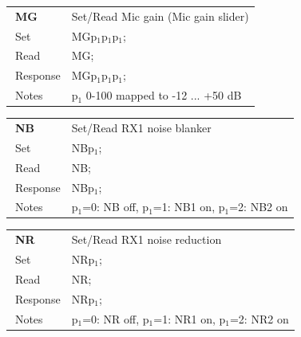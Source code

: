 \documentclass[12pt]{book}
\begin{document}
\begin{center}
\begin{tabular}{|p{2cm}|p{11cm}|}
\toprule
$\phantom{\Big|}$\textbf{\large MG} & Set/Read Mic gain (Mic gain slider) \\\cline{1-2}
$\phantom{\Big|}${\large Set} & {MGp$_1$p$_1$p$_1$;} \\\hline
$\phantom{\Big|}${\large Read} & {MG;} \\\hline
$\phantom{\Big|}${\large Response} & {MGp$_1$p$_1$p$_1$;} \\\hline
$\phantom{\Big|}${\large Notes} & \multicolumn{1}{|p{11cm}|}{p$_1$ 0-100 mapped to -12 ... +50 dB} \\
\bottomrule
\end{tabular}
\end{center}

\begin{center}
\begin{tabular}{|p{2cm}|p{11cm}|}
\toprule
$\phantom{\Big|}$\textbf{\large NB} & Set/Read RX1 noise blanker \\\cline{1-2}
$\phantom{\Big|}${\large Set} & {NBp$_1$;} \\\hline
$\phantom{\Big|}${\large Read} & {NB;} \\\hline
$\phantom{\Big|}${\large Response} & {NBp$_1$;} \\\hline
$\phantom{\Big|}${\large Notes} & \multicolumn{1}{|p{11cm}|}{p$_1$=0: NB off, p$_1$=1: NB1 on, p$_1$=2: NB2 on} \\
\bottomrule
\end{tabular}
\end{center}

\begin{center}
\begin{tabular}{|p{2cm}|p{11cm}|}
\toprule
$\phantom{\Big|}$\textbf{\large NR} & Set/Read RX1 noise reduction \\\cline{1-2}
$\phantom{\Big|}${\large Set} & {NRp$_1$;} \\\hline
$\phantom{\Big|}${\large Read} & {NR;} \\\hline
$\phantom{\Big|}${\large Response} & {NRp$_1$;} \\\hline
$\phantom{\Big|}${\large Notes} & \multicolumn{1}{|p{11cm}|}{p$_1$=0: NR off, p$_1$=1: NR1 on, p$_1$=2: NR2 on} \\
\bottomrule
\end{tabular}
\end{center}
\end{document}
